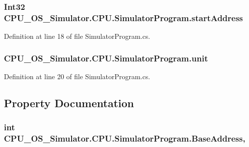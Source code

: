 \subsubsection[{start\+Address}]{\setlength{\rightskip}{0pt plus 5cm}Int32 C\+P\+U\+\_\+\+O\+S\+\_\+\+Simulator.\+C\+P\+U.\+Simulator\+Program.\+start\+Address\hspace{0.3cm}{\ttfamily [private]}}\label{class_c_p_u___o_s___simulator_1_1_c_p_u_1_1_simulator_program_a7b2581eff41da814292bf29936ab5318}


Definition at line 18 of file Simulator\+Program.\+cs.

\hypertarget{class_c_p_u___o_s___simulator_1_1_c_p_u_1_1_simulator_program_a10e4c29c3ed9b84c0fb8aee7613cabf9}{}
\subsubsection[{unit}]{ C\+P\+U\+\_\+\+O\+S\+\_\+\+Simulator.\+C\+P\+U.\+Simulator\+Program.\+unit\hspace{0.3cm}{\ttfamily [private]}}\label{class_c_p_u___o_s___simulator_1_1_c_p_u_1_1_simulator_program_a10e4c29c3ed9b84c0fb8aee7613cabf9}


Definition at line 20 of file Simulator\+Program.\+cs.



\subsection{Property Documentation}
\hypertarget{class_c_p_u___o_s___simulator_1_1_c_p_u_1_1_simulator_program_ad07bee447d47fb07243a4484b5740c21}{}
\subsubsection[{Base\+Address}]{\setlength{\rightskip}{0pt plus 5cm}int C\+P\+U\+\_\+\+O\+S\+\_\+\+Simulator.\+C\+P\+U.\+Simulator\+Program.\+Base\+Address\hspace{0.3cm}{\ttfamily [get]}, {\ttfamily [set]}}\label{class_c_p_u___o_s___simulator_1_1_c_p_u_1_1_simulator_program_ad07bee447d47fb07243a4484b5740c21}


